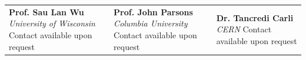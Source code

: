 \documentclass{letter}
\begin{document}
\begin{tabular}{p{}p{}p{}}
  \textbf{Prof. Sau Lan Wu} \newline
  \textit{University of Wisconsin} \newline
  Contact available upon request
  &
  \textbf{Prof. John Parsons} \newline
  \textit{Columbia University} \newline
  Contact available upon request
  &
  \textbf{Dr. Tancredi Carli} \newline
  \textit{CERN} \newline
  Contact available upon request
\end{tabular}
\end{document}
